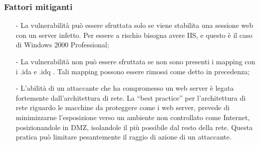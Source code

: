 \subsubsection{Fattori mitiganti}
\begin{itemize}
\item[-]La vulnerabilità può essere sfruttata solo se viene stabilita una sessione web con un server infetto. Per essere a rischio bisogna avere IIS, e questo è il caso di Windows 2000 Professional;
\item[-]La vulnerabilità non può essere sfruttata se non sono presenti i mapping con i .ida e .idq . Tali mapping possono essere rimossi come detto in precedenza;
\item[-]L’abilità di un attaccante che ha compromesso un web server è legata fortemente dall’architettura di rete. La “best practice” per l’architettura di rete riguardo le macchine da proteggere come i web server, prevede di minimizzarne l’esposizione verso un ambiente non controllato come Internet, posizionandole in DMZ, isolandole il più possibile dal resto della rete. Questa pratica può limitare pesantemente il raggio di azione di un attaccante.
\end{itemize}

